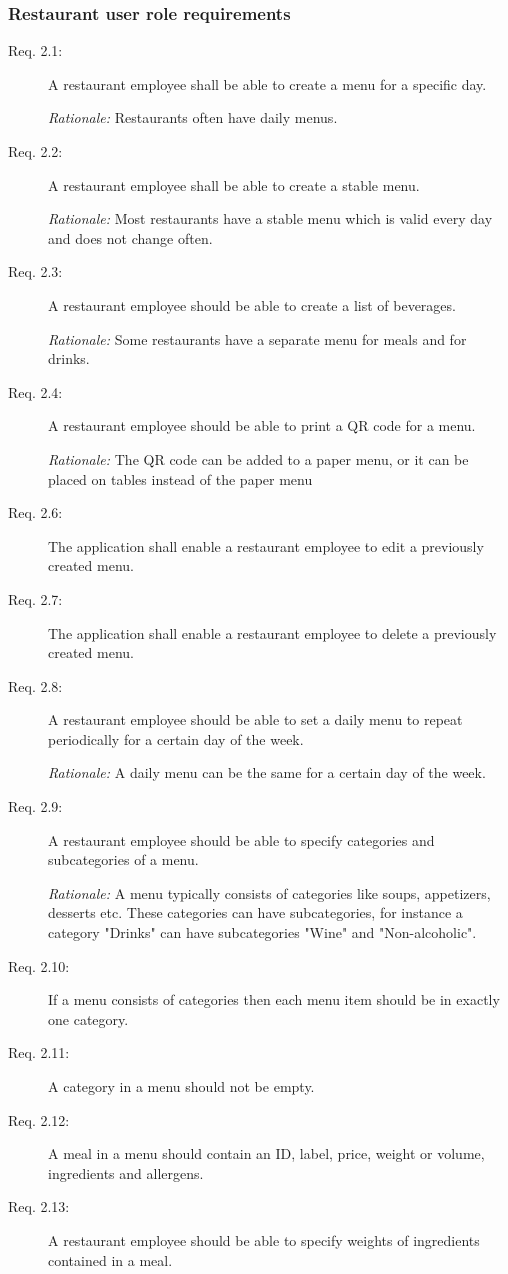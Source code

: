 \subsubsection{Restaurant user role requirements}
\begin{description}
    \item [Req. 2.1:] A restaurant employee shall be able to create a menu for a specific day.

    \emph{Rationale:} Restaurants often have daily menus.
    \item [Req. 2.2:] A restaurant employee shall be able to create a stable menu.

    \emph{Rationale:} Most restaurants have a stable menu which is valid every day and does not change often.
    \item [Req. 2.3:] A restaurant employee should be able to create a list of beverages.

    \emph{Rationale:} Some restaurants have a separate menu for meals and for drinks.
    \item [Req. 2.4:] A restaurant employee should be able to print a QR code for a menu.

    \emph{Rationale:} The QR code can be added to a paper menu, or it can be placed on tables instead of the paper menu
   
    \item [Req. 2.6:] The application shall enable a restaurant employee to edit a previously created menu.
    \item [Req. 2.7:] The application shall enable a restaurant employee to delete a previously created menu.
    \item [Req. 2.8:] A restaurant employee should be able to set a daily menu to repeat periodically for a certain day of the week.

    \emph{Rationale:} A daily menu can be the same for a certain day of the week.
    \item [Req. 2.9:] A restaurant employee should be able to specify categories and subcategories of a menu.

    \emph{Rationale:} A menu typically consists of categories like soups, appetizers, desserts etc. These categories can have subcategories, for instance a category "Drinks" can have subcategories "Wine" and "Non-alcoholic".
    \item [Req. 2.10:] If a menu consists of categories then each menu item should be in exactly one category.
    \item [Req. 2.11:] A category in a menu should not be empty.   
    \item [Req. 2.12:] A meal in a menu should contain an ID, label, price, weight or volume, ingredients and allergens.
    \item [Req. 2.13:] A restaurant employee should be able to specify weights of ingredients contained in a meal.


\end{description}
